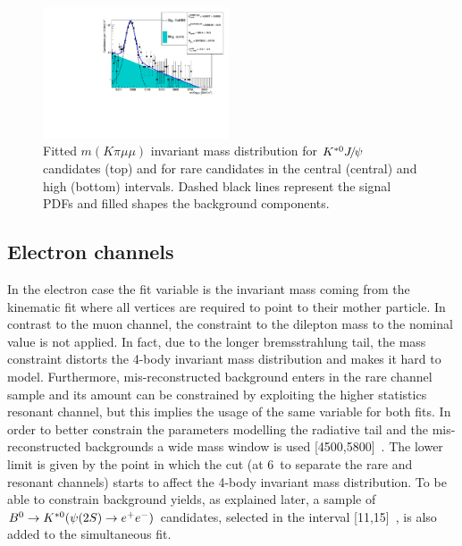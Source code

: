 \begin{figure}[h!]
\includegraphics[width=0.49\textwidth]{RKst/figs/Fit/fit_MM/KstMM_high_log.pdf}
\caption{Fitted $m(K\pi \mu\mu)$ invariant mass distribution for $\Kstarz\jpsi$ candidates (top)
and for rare candidates in the central (central) and high (bottom) \qsq intervals.
Dashed black lines represent the signal PDFs and filled shapes the background components. }
\label{fig:mumu_data_fits}
\end{figure}


\subsection{Electron channels}
\label{sec:RKst_fit_ee}

In the electron case the fit variable is the \mKpiee invariant mass coming from the kinematic
fit where all vertices are required to point to their mother particle. 
In contrast to the muon channel,
the constraint to the dilepton mass to the \jpsi nominal value is not applied.
In fact, due to the longer bremsstrahlung tail, the \jpsi mass constraint distorts the 4-body invariant mass
distribution and makes it hard to model. Furthermore, mis-reconstructed background enters in the rare channel
sample and its amount can be constrained by exploiting the higher statistics resonant channel, but this implies
the usage of the same variable for both fits.
In order to better constrain the parameters modelling the radiative tail and the mis-reconstructed
backgrounds a wide mass window is used [4500,5800]~\mevcc. The lower limit is given
by the point in which the \qsq cut (at 6~\gevgevcccc to separate the rare and resonant channels)
starts to affect the 4-body invariant mass distribution.
To be able to constrain background yields, as explained later, a sample of $\Bd\to\Kstarz(\psitwos\to\ee)$
candidates, selected in the \qsq interval [11,15]~\gevgevcccc, is also added to the simultaneous fit.


